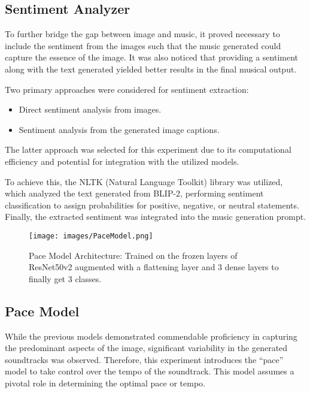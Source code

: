 \documentclass[conference]{IEEEtran}
\begin{document}
\subsection{Sentiment Analyzer}

To further bridge the gap between image and music, it proved necessary to include the sentiment from the images such that the music generated could capture the essence of the image. It was also noticed that providing a sentiment along with the text generated yielded better results in the final musical output.

Two primary approaches were considered for sentiment extraction:

\begin{itemize}
    \item Direct sentiment analysis from images.
    \item Sentiment analysis from the generated image captions.
\end{itemize}

The latter approach was selected for this experiment due to its computational efficiency and potential for integration with the utilized models.

To achieve this, the NLTK (Natural Language Toolkit) library was utilized, which analyzed the text generated from BLIP-2, performing sentiment classification to assign probabilities for positive, negative, or neutral statements. Finally, the extracted sentiment was integrated into the music generation prompt.

\begin{figure}[ht]
    \centering
    \texttt{[image: images/PaceModel.png]}
    \caption{Pace Model Architecture: Trained on the frozen layers of ResNet50v2 augmented with a flattening layer and 3 dense layers to finally get 3 classes.}
    \label{fig:pace-model}
\end{figure}

\subsection{Pace Model}

While the previous models demonstrated commendable proficiency in capturing the predominant aspects of the image, significant variability in the generated soundtracks was observed. Therefore, this experiment introduces the ``pace'' model to take control over the tempo of the soundtrack. This model assumes a pivotal role in determining the optimal pace or tempo.
\\
\end{document}
